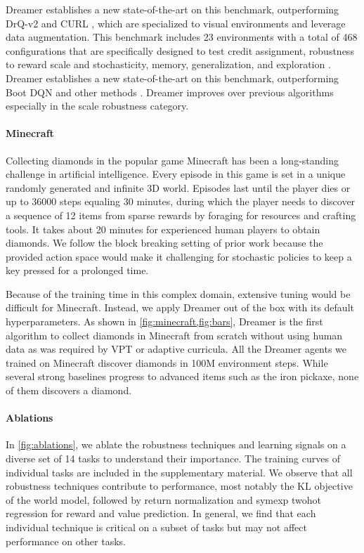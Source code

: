 \begin{itemize}
Dreamer establishes a new state-of-the-art on this benchmark, outperforming DrQ-v2 and CURL \citep{yarats2021drqv2}, which are specialized to visual environments and leverage data augmentation.
\pagebreak
{} This benchmark includes 23 environments with a total of 468 configurations that are specifically designed to test credit assignment, robustness to reward scale and stochasticity, memory, generalization, and exploration \citep{osband2019bsuite}. Dreamer establishes a new state-of-the-art on this benchmark, outperforming Boot DQN and other methods \citep{dizon2023bsuiteagents}.
Dreamer improves over previous algorithms especially in the scale robustness category.
\end{itemize}

\paragraph{Minecraft}
Collecting diamonds in the popular game Minecraft has been a long-standing challenge in artificial intelligence\citep{guss2019minerl,kanitscheider2021minecraftcurriculum,baker2022vpt}.
Every episode in this game is set in a unique randomly generated and infinite 3D world. Episodes last until the player dies or up to 36000 steps equaling 30 minutes, during which the player needs to discover a sequence of 12 items from sparse rewards by foraging for resources and crafting tools. It takes about 20 minutes for experienced human players to obtain diamonds\citep{baker2022vpt}.
We follow the block breaking setting of prior work \citep{kanitscheider2021minecraftcurriculum} because the provided action space would make it challenging for stochastic policies to keep a key pressed for a prolonged time.

Because of the training time in this complex domain, extensive tuning would be difficult for Minecraft.
Instead, we apply Dreamer out of the box with its default hyperparameters.
As shown in \cref{fig:minecraft,fig:bars}, Dreamer is the first algorithm to collect diamonds in Minecraft from scratch without using human data as was required by VPT \citep{baker2022vpt} or adaptive curricula\citep{kanitscheider2021minecraftcurriculum}.
All the Dreamer agents we trained on Minecraft discover diamonds in 100M environment steps.
While several strong baselines progress to advanced items such as the iron pickaxe, none of them discovers a diamond.

\paragraph{Ablations}
In \cref{fig:ablations}, we ablate the robustness techniques and learning signals on a diverse set of 14 tasks to understand their importance.
The training curves of individual tasks are included in the supplementary material.
We observe that all robustness techniques contribute to performance, most notably the KL objective of the world model, followed by return normalization and symexp twohot regression for reward and value prediction. In general, we find that each individual technique is critical on a subset of tasks but may not affect performance on other tasks.

